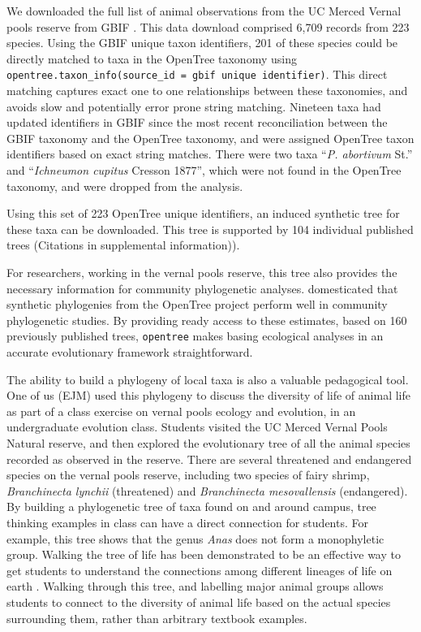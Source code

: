 \documentclass[oupdraft]{sysbio_sse}
\begin{document}
We downloaded the full list of animal observations from the UC Merced Vernal pools reserve from GBIF \citep{gbif_secretariat_gbif_2019}. This data download comprised 6,709 records from 223 species. Using the GBIF unique taxon identifiers, 201 of these species could be directly matched to taxa in the OpenTree taxonomy using \texttt{opentree.taxon\_info(source\_id = {gbif unique identifier})}. This direct matching captures exact one to one relationships between these taxonomies, and avoids slow and potentially error prone string matching. Nineteen taxa had updated identifiers in GBIF since the most recent reconciliation between the GBIF taxonomy and the OpenTree taxonomy, and were assigned OpenTree taxon identifiers based on exact string matches. There were two taxa ``\textit{P. abortivum} St.'' and ``\textit{Ichneumon cupitus} Cresson 1877'', which were not found in the OpenTree taxonomy, and were dropped from the analysis.


Using this set of 223 OpenTree unique identifiers, an induced synthetic tree for these taxa can be downloaded. This tree is supported by 104 individual published trees (Citations in supplemental information)).


For researchers, working in the vernal pools reserve, this tree also provides the necessary information for community phylogenetic analyses. \citet{li_for_2019} domesticated that synthetic phylogenies from the OpenTree project perform well in community phylogenetic studies. By providing ready access to these estimates, based on 160 previously published trees, \texttt{opentree} makes basing ecological analyses in an accurate evolutionary framework straightforward.


The ability to build a phylogeny of local taxa is also a valuable pedagogical tool. One of us (EJM) used this phylogeny to discuss the diversity of life of animal life as part of a class exercise on vernal pools ecology and evolution, in an undergraduate evolution class. 
Students visited the UC Merced Vernal Pools Natural reserve, and then explored the evolutionary tree of all the animal species recorded as observed in the reserve. 
There are several threatened and endangered species on the vernal pools reserve, including two species of fairy shrimp, \textit{Branchinecta lynchii} (threatened) and \textit{Branchinecta mesovallensis} (endangered). 
By building a phylogenetic tree of taxa found on and around campus, tree thinking examples in class can have a direct connection for students. For example, this tree shows that the genus \textit{Anas} does not form a monophyletic group. Walking the tree of life has been demonstrated to be an effective way to get students to understand the connections among different lineages of life on earth \citep{ballen_walking_2017}. Walking through this tree, and labelling major animal groups allows students to connect to the diversity of animal life based on the actual species surrounding them, rather than arbitrary textbook examples.
\end{document}
